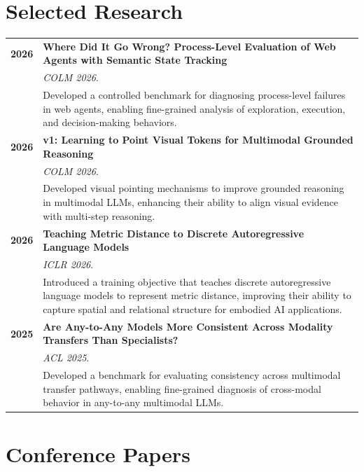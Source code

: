 \documentclass[11pt]{article} %
\begin{document}
\section*{Selected Research}
\begin{longtable}{@{}p{} p{}@{}}

\textbf{2026} &
\textbf{Where Did It Go Wrong? Process-Level Evaluation of Web Agents with Semantic State Tracking} \\
& \emph{COLM 2026}. \\
& Developed a controlled benchmark for diagnosing process-level failures in web agents, enabling fine-grained analysis of exploration, execution, and decision-making behaviors. \\[0.8em]

\textbf{2026} &
\textbf{v1: Learning to Point Visual Tokens for Multimodal Grounded Reasoning} \\
& \emph{COLM 2026}. \\
& Developed visual pointing mechanisms to improve grounded reasoning in multimodal LLMs, enhancing their ability to align visual evidence with multi-step reasoning. \\[0.8em]

\textbf{2026} &
\textbf{Teaching Metric Distance to Discrete Autoregressive Language Models} \\
& \emph{ICLR 2026}. \\
& Introduced a training objective that teaches discrete autoregressive language models to represent metric distance, improving their ability to capture spatial and relational structure for embodied AI applications. \\[0.8em]

\textbf{2025} &
\textbf{Are Any-to-Any Models More Consistent Across Modality Transfers Than Specialists?} \\
& \emph{ACL 2025}. \\
& Developed a benchmark for evaluating consistency across multimodal transfer pathways, enabling fine-grained diagnosis of cross-modal behavior in any-to-any multimodal LLMs. \\

\end{longtable}

\vspace{-1.0em}
\section*{Conference Papers}
\label{pubs_conf}
\end{document}
